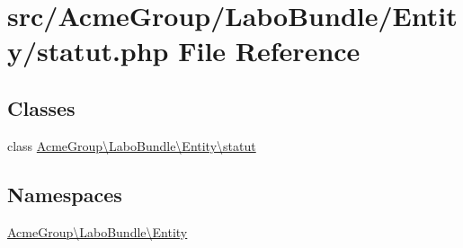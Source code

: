 \hypertarget{statut_8php}{\section{src/\+Acme\+Group/\+Labo\+Bundle/\+Entity/statut.php File Reference}
\label{statut_8php}
}
\subsection*{Classes}
\begin{DoxyCompactItemize}
\item 
class \hyperlink{class_acme_group_1_1_labo_bundle_1_1_entity_1_1statut}{Acme\+Group\textbackslash{}\+Labo\+Bundle\textbackslash{}\+Entity\textbackslash{}statut}
\end{DoxyCompactItemize}
\subsection*{Namespaces}
\begin{DoxyCompactItemize}
\item 
 \hyperlink{namespace_acme_group_1_1_labo_bundle_1_1_entity}{Acme\+Group\textbackslash{}\+Labo\+Bundle\textbackslash{}\+Entity}
\end{DoxyCompactItemize}
